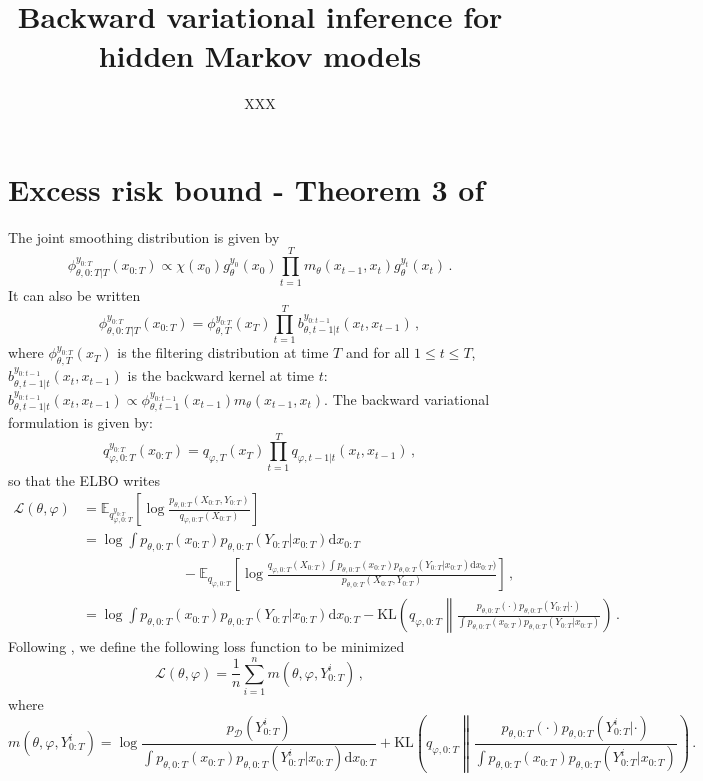\documentclass{article}
\title{Backward variational inference for hidden Markov models}
\date{}
\author[$\dag$]{XXX}
\affil[$\dag$]{{\small }}
\newcommand{\1}{\mathbbm{1}}
\newcommand{\rmd}{\ensuremath{\mathrm{d}}}
\begin{document}
\maketitle

\begin{abstract}

\end{abstract}



\section{Excess risk bound - Theorem 3 of \cite{tang21a}}
The joint smoothing distribution is given by
$$
\phi^{y_{0:T}}_{\theta,0:T|T}(x_{0:T}) \propto \chi(x_{0})g_\theta^{y_0}(x_0) \prod_{t=1}^Tm_\theta(x_{t-1},x_t)g_\theta^{y_t}(x_t)\,.
$$
It can also be written
$$
\phi^{y_{0:T}}_{\theta,0:T|T}(x_{0:T}) = \phi^{y_{0:T}}_{\theta,T}(x_{T}) \prod_{t=1}^Tb^{y_{0:t-1}}_{\theta,t-1|t}(x_t,x_{t-1})\,,
$$
where $\phi^{y_{0:T}}_{\theta,T}(x_{T})$ is the filtering distribution at time $T$ and for all $1\leq t \leq T$, $b^{y_{0:t-1}}_{\theta,t-1|t}(x_t,x_{t-1})$ is the backward kernel at time $t$: $b^{y_{0:t-1}}_{\theta,t-1|t}(x_t,x_{t-1})\propto \phi^{y_{0:t-1}}_{\theta,t-1}(x_{t-1})m_\theta(x_{t-1},x_t)$. The backward variational formulation is given by:
$$
q_{\varphi,0:T}^{y_{0:T}}(x_{0:T}) = q_{\varphi,T}(x_T)\prod_{t=1}^Tq_{\varphi,t-1|t}(x_t,x_{t-1})\,,
$$
so that the ELBO writes
\begin{align*}
\mathcal{L}(\theta,\varphi) &= \mathbb{E}_{q^{y_{0:T}}_{\varphi,0:T}}\left[\log \frac{p_{\theta,0:T}(X_{0:T},Y_{0:T})}{q_{\varphi,0:T}(X_{0:T})}\right]\\
&= \log \int p_{\theta,0:T}(x_{0:T})p_{\theta,0:T}(Y_{0:T}|x_{0:T}) \rmd x_{0:T}\\
&\hspace{3cm}-\mathbb{E}_{q_{\varphi,0:T}}\left[\log \frac{q_{\varphi,0:T}(X_{0:T})\int p_{\theta,0:T}(x_{0:T})p_{\theta,0:T}(Y_{0:T}|x_{0:T})\rmd x_{0:T})}{p_{\theta,0:T}(X_{0:T},Y_{0:T})}\right]\,,\\
&= \log \int p_{\theta,0:T}(x_{0:T})p_{\theta,0:T}(Y_{0:T}|x_{0:T}) \rmd x_{0:T}- \mathrm{KL}\left(q_{\varphi,0:T}\middle\| \frac{p_{\theta,0:T}(\cdot)p_{\theta,0:T}(Y_{0:T}|\cdot)}{\int p_{\theta,0:T}(x_{0:T})p_{\theta,0:T}(Y_{0:T}|x_{0:T})}\right)\,.
\end{align*}
Following \cite{tang21a}, we define the following loss function to be minimized
$$
\mathcal{L}(\theta,\varphi) = \frac{1}{n}\sum_{i=1}^nm(\theta,\varphi,Y^i_{0:T})\,,
$$
where
$$
m(\theta,\varphi,Y^i_{0:T}) = \log \frac{p_{\mathcal{D}}(Y^i_{0:T})}{\int p_{\theta,0:T}(x_{0:T})p_{\theta,0:T}(Y^i_{0:T}|x_{0:T}) \rmd x_{0:T}} + \mathrm{KL}\left(q_{\varphi,0:T}\middle\| \frac{p_{\theta,0:T}(\cdot)p_{\theta,0:T}(Y^i_{0:T}|\cdot)}{\int p_{\theta,0:T}(x_{0:T})p_{\theta,0:T}(Y^i_{0:T}|x_{0:T})}\right)\,.
$$
\end{document}
